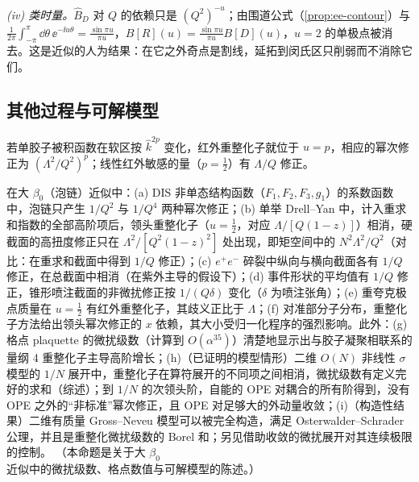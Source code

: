 \begin{example}[带 $n$ 个费米子泡的单胶子]
\emph{(iv) 类时量。}$\hat B_D$ 对 $Q$ 的依赖只是 $(Q^2)^{-u}$；由围道公式（\cref{prop:ee-contour}）与 $\frac1{2\pi}\int_{-\pi}^{\pi}\dd\theta\,\ee^{-\ii u\theta}=\frac{\sin\pi u}{\pi u}$，$B[R](u)=\frac{\sin\pi u}{\pi u}B[D](u)$\cite[式~(5.15)]{Beneke1999}，$u=2$ 的单极点被消去。这是近似的人为结果：在它之外奇点是割线，延拓到闵氏区只削弱而不消除它们\cite[第~5.2.1~节]{Beneke1999}。
\end{example}

\subsection{其他过程与可解模型}

若单胶子被积函数在软区按 $\hat k^{2p}$ 变化，红外重整化子就位于 $u=p$，相应的幂次修正为 $(\Lambda^2/Q^2)^p$；线性红外敏感的量（$p=\frac12$）有 $\Lambda/Q$ 修正。

\begin{proposition}\label{prop:power-renormalon-examples}
在大 $\beta_0$（泡链）近似中：(a) DIS 非单态结构函数（$F_1,F_2,F_3,g_1$）的系数函数中，泡链只产生 $1/Q^2$ 与 $1/Q^4$ 两种幂次修正\cite{DasguptaWebber1996}；(b) 单举 Drell--Yan 中，计入重求和指数的全部高阶项后，领头重整化子（$u=\frac12$，对应 $\Lambda/[Q(1-z)]$）相消，硬截面的高扭度修正只在 $\Lambda^2/[Q^2(1-z)^2]$ 处出现，即矩空间中的 $N^2\Lambda^2/Q^2$\cite{BenekeBraun1995b}（对比：\cite{Korchemsky:1994is}在重求和截面中得到 $1/Q$ 修正）；(c) $e^+e^-$ 碎裂中纵向与横向截面各有 $1/Q$ 修正，在总截面中相消（在紫外主导的假设下）\cite{BenekeBraunMagnea1997}；(d) 事件形状的平均值有 $1/Q$ 修正\cite{DokshitzerWebber1995}，锥形喷注截面的非微扰修正按 $1/(Q\delta)$ 变化（$\delta$ 为喷注张角）\cite{Korchemsky:1994is}；(e) 重夸克极点质量在 $u=\frac12$ 有红外重整化子，其歧义正比于 $\Lambda$\cite{Bigi:1994em,Beneke:1994sw}；(f) 对准部分子分布，重整化子方法给出领头幂次修正的 $x$ 依赖，其大小受归一化程序的强烈影响\cite{Braun:2018brg}。此外：(g) 格点 plaquette 的微扰级数（计算到 $O(\alpha^{35})$）清楚地显示出与胶子凝聚相联系的量纲 4 重整化子主导高阶增长\cite{Bali:2014fea}；(h)（已证明的模型情形）二维 $O(N)$ 非线性 $\sigma$ 模型的 $1/N$ 展开中，重整化子在算符展开的不同项之间相消，微扰级数有定义完好的求和\cite{David:1982qv}（综述\cite{Novikov:1984ac}）；到 $1/N$ 的次领头阶，自能的 OPE 对耦合的所有阶得到，没有 OPE 之外的“非标准”幂次修正，且 OPE 对足够大的外动量收敛\cite{Beneke:1998eq}；(i)（构造性结果）二维有质量 Gross--Neveu 模型可以被完全构造，满足 Osterwalder--Schrader 公理，并且是重整化微扰级数的 Borel 和\cite{Feldman:1986ax}；另见借助收敛的微扰展开对其连续极限的控制\cite{Gawedzki:1985ez}。
（本命题是关于大 $\beta_0$ 近似中的微扰级数、格点数值与可解模型的陈述。）
\end{proposition}

